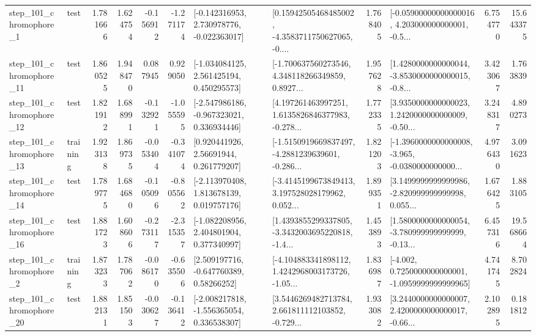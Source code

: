 \begin{tabular}{llrrrrllrlrr}
   step\_101\_chromophore\_1 &      test &      1.781666 &    1.624754 &     -0.156912 & -1.271174 &   [-0.142316953, 2.730978776, -0.022363017] &  [0.15942505468485002, -4.3583711750627065, -0.... &       1.768405 &  [-0.05900000000000016, 4.203000000000001, -0.5... &            6.754770 &         15.643375 \\
  step\_101\_chromophore\_11 &      test &      1.860525 &    1.948470 &      0.087945 &  0.929050 &    [-1.034084125, 2.561425194, 0.450295573] &  [-1.700637560273546, 4.348118266349859, 0.8927... &       1.957628 &  [1.4280000000000044, -3.8530000000000015, -0.8... &            3.423067 &          1.763839 \\
  step\_101\_chromophore\_12 &      test &      1.821912 &    1.688991 &     -0.132921 & -1.055595 &   [-2.547986186, -0.967323021, 0.336934446] &  [4.197261463997251, 1.6135826846377983, -0.278... &       1.772335 &  [3.9350000000000023, 1.2420000000000009, -0.50... &            3.248317 &          4.890273 \\
  step\_101\_chromophore\_13 &  training &      1.923138 &    1.869735 &     -0.053404 & -0.341074 &      [0.920441926, 2.56691944, 0.261779207] &  [-1.5150919669837497, -4.2881239639601, -0.286... &       1.821203 &  [-1.3960000000000008, -3.965, -0.0380000000000... &            4.976430 &          3.091623 \\
  step\_101\_chromophore\_14 &      test &      1.789775 &    1.684680 &     -0.105096 & -0.805562 &    [-2.113970408, 1.813678139, 0.019757176] &  [-3.4145199673849413, 3.197528028179962, 0.052... &       1.899351 &  [3.1499999999999986, -2.820999999999998, 0.055... &            1.676425 &          1.883105 \\
  step\_101\_chromophore\_16 &      test &      1.881723 &    1.608606 &     -0.273117 & -2.315357 &    [-1.082208956, 2.404801904, 0.377340997] &  [1.4393855299337805, -3.3432003695220818, -1.4... &       1.453893 &  [1.5800000000000054, -3.780999999999999, -0.13... &            6.457316 &         19.568664 \\
   step\_101\_chromophore\_2 &  training &      1.873233 &    1.787062 &     -0.086170 & -0.635506 &     [2.509197716, -0.647760389, 0.58266252] &  [-4.104883341898112, 1.4242968003173726, -1.05... &       1.836987 &  [-4.002, 0.7250000000000001, -1.0959999999999965] &            4.741745 &          8.702824 \\
  step\_101\_chromophore\_20 &      test &      1.882131 &    1.851503 &     -0.030627 & -0.136412 &   [-2.008217818, -1.556365054, 0.336538307] &  [3.5446269482713784, 2.661811112103852, -0.729... &       1.933082 &  [3.2440000000000007, 2.4200000000000017, -0.66... &            2.102895 &          0.181812 \\

\end{tabular}
